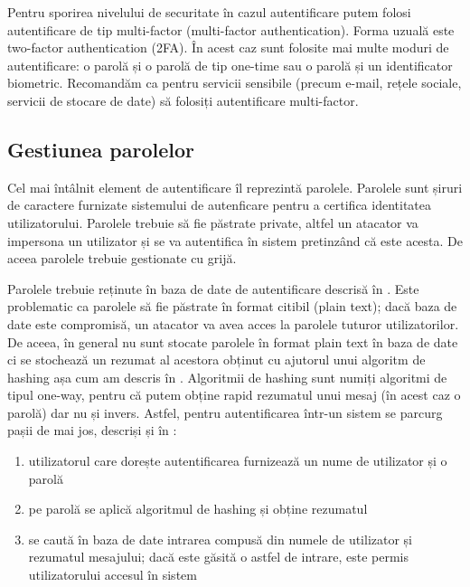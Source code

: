 Pentru sporirea nivelului de securitate în cazul autentificare putem folosi autentificare de tip multi-factor (multi-factor authentication). Forma uzuală este two-factor authentication (2FA). În acest caz sunt folosite mai multe moduri de autentificare: o parolă și o parolă de tip one-time sau o parolă și un identificator biometric. Recomandăm ca pentru servicii sensibile (precum e-mail, rețele sociale, servicii de stocare de date) să folosiți autentificare multi-factor.

\subsection{Gestiunea parolelor}
\label{sec:sec:password}

Cel mai întâlnit element de autentificare îl reprezintă parolele. Parolele sunt șiruri de caractere furnizate sistemului de autenficare pentru a certifica identitatea utilizatorului. Parolele trebuie să fie păstrate private, altfel un atacator va impersona un utilizator și se va autentifica în sistem pretinzând că este acesta. De aceea parolele trebuie gestionate cu grijă.

Parolele trebuie reținute în baza de date de autentificare descrisă în . Este problematic ca parolele să fie păstrate în format citibil (plain text); dacă baza de date este compromisă, un atacator va avea acces la parolele tuturor utilizatorilor. De aceea, în general nu sunt stocate parolele în format plain text în baza de date ci se stochează un rezumat al acestora obținut cu ajutorul unui algoritm de hashing așa cum am descris în . Algoritmii de hashing sunt numiți algoritmi de tipul one-way, pentru că putem obține rapid rezumatul unui mesaj (în acest caz o parolă) dar nu și invers. Astfel, pentru autentificarea într-un sistem se parcurg pașii de mai jos, descriși și în :

\begin{enumerate}
  \item utilizatorul care dorește autentificarea furnizează un nume de utilizator și o parolă
  \item pe parolă se aplică algoritmul de hashing și obține rezumatul
  \item se caută în baza de date intrarea compusă din numele de utilizator și rezumatul mesajului; dacă este găsită o astfel de intrare, este permis utilizatorului accesul în sistem
\end{enumerate}

